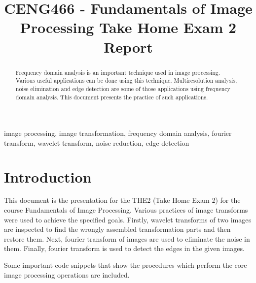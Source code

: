 \documentclass[conference]{IEEEtran}
\begin{document}
\title{CENG466 - Fundamentals of Image Processing Take Home Exam 2 Report \\
}
\author{
\and
{}
}

\maketitle

\begin{abstract}
Frequency domain analysis is an important technique used in image processing. Various
useful applications can be done using this technique. Multiresolution analysis, noise
elimination and edge detection are some of those applications using frequency domain
analysis. This document presents the practice of such applications.
\end{abstract}

\begin{IEEEkeywords}
image processing, image transformation, frequency domain analysis, fourier transform, wavelet
transform, noise reduction, edge detection
\end{IEEEkeywords}

\section{Introduction}
This document is the presentation for the THE2 (Take Home Exam 2) for the
course Fundamentals of Image Processing. Various practices of image transforms were used
to achieve the specified goals. Firstly, wavelet transforms of two images are inspected to
find the wrongly assembled transformation parts and then restore them. Next, fourier transform
of images are used to eliminate the noise in them. Finally, fourier transform is used to
detect the edges in the given images.

Some important code snippets that show the procedures which perform the core image processing operations
are included.
\end{document}
